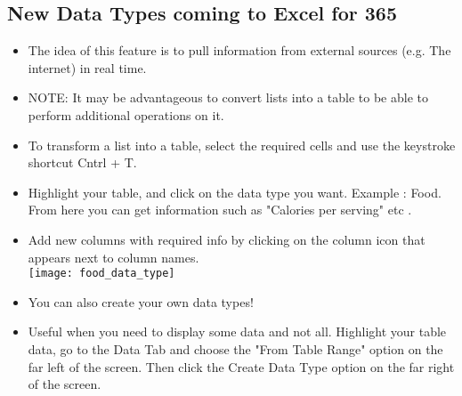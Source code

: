 \documentclass[11pt, oneside]{article}   	%
\begin{document}
\subsection{New Data Types coming to Excel for 365}
\begin{itemize}
\item The idea of this feature is to pull information from external sources (e.g. The internet) in real time. 
\item NOTE: It may be advantageous to convert lists into a table to be able to perform additional operations on it.
\item To transform a list into a table, select the required cells and use the keystroke shortcut Cntrl + T.
\item Highlight your table, and click on the data type you want. Example : Food. From here you can get information such as "Calories per serving" etc .
\item Add new columns with required info by clicking on the column icon that appears next to column names. 
\bigskip\\
\texttt{[image: food\_data\_type]}
\bigskip\\
\item You can also create your own data types!
\item Useful when you need to display some data and not all.  Highlight your table data, go to the Data Tab and choose the "From Table Range" option on the far left of the screen. Then click the Create Data Type option on the far right of the screen.
\end{itemize}
\end{document}
